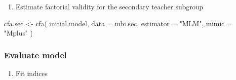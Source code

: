\documentclass[
]{article}
\newenvironment{Shaded}{\begin{snugshade}}{\end{snugshade}}
\newcommand{\AttributeTok}[1]{\textcolor[rgb]{0.77,0.63,0.00}{#1}}
\newcommand{\FunctionTok}[1]{\textcolor[rgb]{0.00,0.00,0.00}{#1}}
\newcommand{\NormalTok}[1]{#1}
\newcommand{\OtherTok}[1]{\textcolor[rgb]{0.56,0.35,0.01}{#1}}
\newcommand{\StringTok}[1]{\textcolor[rgb]{0.31,0.60,0.02}{#1}}
\providecommand{\tightlist}{%
  \setlength{\itemsep}{0pt}\setlength{\parskip}{0pt}}
\begin{document}
\begin{enumerate}
\def\labelenumi{(\arabic{enumi})}
\setcounter{enumi}{1}
\tightlist
\item
  Estimate factorial validity for the secondary teacher subgroup
\end{enumerate}

\begin{Shaded}
\begin{Highlighting}[]
\NormalTok{cfa.sec }\OtherTok{\textless{}{-}} 
  \FunctionTok{cfa}\NormalTok{(}
\NormalTok{    initial.model, }
    \AttributeTok{data =}\NormalTok{ mbi.sec,  }
    \AttributeTok{estimator =} \StringTok{"MLM"}\NormalTok{,}
    \AttributeTok{mimic =} \StringTok{"Mplus"}
\NormalTok{    )}
\end{Highlighting}
\end{Shaded}

\hypertarget{evaluate-model}{%
\subsubsection{Evaluate model}\label{evaluate-model}}

\begin{enumerate}
\def\labelenumi{(\arabic{enumi})}
\tightlist
\item
  Fit indices
\end{enumerate}
\end{document}
